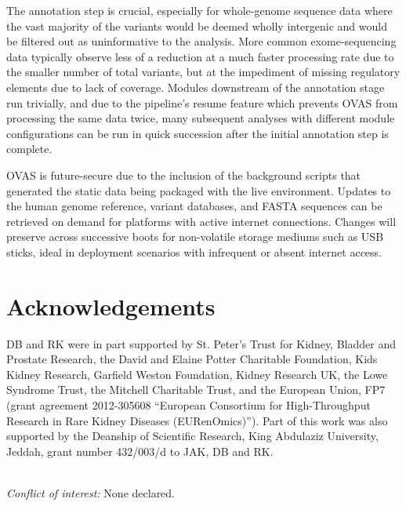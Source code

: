 \documentclass{bioinfo}
\def\app{OVAS}
\begin{document}
The annotation step is crucial, especially for whole-genome sequence data where the vast majority of the variants would be deemed wholly intergenic and would be filtered out as uninformative to the analysis. More common exome-sequencing data typically observe less of a reduction at a much faster processing rate due to the smaller number of total variants, but at the impediment of missing regulatory elements due to lack of coverage. Modules downstream of the annotation stage run trivially, and due to the pipeline's resume feature which prevents \app{} from processing the same data twice, many subsequent analyses with different module configurations can be run in quick succession after the initial annotation step is complete.

\app{} is future-secure due to the inclusion of the background scripts that generated the static data being packaged with the live environment. Updates to the human genome reference, variant databases, and FASTA sequences can be retrieved on demand for platforms with active internet connections. Changes will preserve across successive boots for non-volatile storage mediums such as USB sticks, ideal in deployment scenarios with infrequent or absent internet access.


\vspace{-0.3cm}
\section*{Acknowledgements}

DB and RK were in part supported by St. Peter's Trust for Kidney, Bladder and Prostate Research, the David and Elaine Potter Charitable Foundation, Kids Kidney Research, Garfield Weston Foundation, Kidney Research UK, the Lowe Syndrome Trust, the Mitchell Charitable Trust, and the European Union, FP7 (grant agreement 2012-305608 ``European Consortium for High-Throughput Research in Rare Kidney Diseases (EURenOmics)''). Part of this work was also supported by the Deanship of Scientific Research, King Abdulaziz University, Jeddah, grant number 432/003/d to JAK, DB and RK.\\\

\noindent
\textit{Conflict of interest:} None declared.

\vspace{-15pt}



\end{document}
